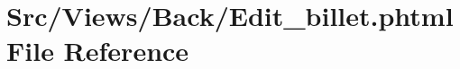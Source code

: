 \hypertarget{_edit__billet_8phtml}{}\section{Src/\+Views/\+Back/\+Edit\+\_\+billet.phtml File Reference}
\label{_edit__billet_8phtml}
